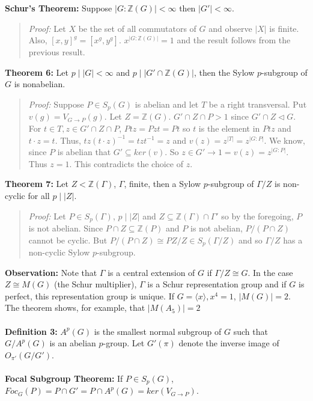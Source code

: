 {\bf Schur's Theorem:} 
Suppose $|G:{\mathbb Z}(G)| < \infty$ then $|G'|< \infty$.
\begin{quote}
\emph{Proof:}  
Let $X$ be the set of all commutators of $G$ and observe $|X|$ is finite.  Also,
$[x,y]^g= [x^g, y^g]$.  
$x^{|G:{\mathbb Z }(G)|}=1$ and the result follows from the previous result.
\end{quote}
{\bf Theorem 6:} Let $p \mid |G| < \infty$ and $p \mid |G' \cap {\mathbb Z}(G)|$, then
the Sylow $p$-subgroup of $G$ is nonabelian.
\begin{quote}
\emph{Proof:}  
Suppose $P \in S_p(G)$ is abelian and let $T$ be a right transversal.  Put
$v(g)= V_{G \rightarrow P}(g)$. Let $Z= {\mathbb Z}(G)$.  
$G' \cap Z \cap P > 1$ since $G' \cap Z \lhd G$.
For $t \in T, z \in G' \cap Z \cap P$, $Ptz=Pzt=Pt$ so $t$ is the element in $Ptz$ and
$t \cdot z= t$.  Thus, $tz(t \cdot z)^{-1}= tzt^{-1}=z$ and $v(z)= z^{|T|}=z^{|G:P|}$.
We know, since $P$ is abelian that $G' \subseteq ker(v)$. So 
$z \in G'\rightarrow 1=v(z)=z^{|G:P|}$.  Thus $z=1$.  This contradicts the choice of $z$.
\end{quote}
{\bf Theorem 7:} Let $Z < {\mathbb Z}(\Gamma)$, $\Gamma$, finite, then a Sylow $p$-subgroup of
$\Gamma/Z$ is non-cyclic for all $p \mid |Z|$.
\begin{quote}
\emph{Proof:}  
Let $P \in S_p( \Gamma )$, $p \mid |Z|$ and $Z \subseteq {\mathbb Z}( \Gamma ) \cap \Gamma'$
so by the foregoing, $P$ is not abelian.  Since $P \cap Z \subseteq {\mathbb Z}(P)$ and
$P$ is not abelian, $P/(P \cap Z)$ cannot be cyclic.  
But $P/(P \cap Z) \cong PZ/Z \in S_p(\Gamma/Z)$ and so $\Gamma/Z$ has a 
non-cyclic Sylow $p$-subgroup.
\end{quote}
{\bf Observation:} Note that $\Gamma$ is a central extension of $G$ if $\Gamma/Z \cong G$.
In the case $Z \cong M(G)$ (the Schur multiplier), $\Gamma$ is a Schur representation group and
if $G$ is perfect, this representation group is unique.  
If $G= \langle x \rangle , x^4=1$, $|M(G)|=2$.  The
theorem shows, for example, that $|M(A_5)|=2$
\\
\\
{\bf Definition 3:} $A^p(G)$ is the smallest normal subgroup of $G$ such that
$G/A^p(G)$ is an abelian $p$-group. Let $G'(\pi)$ denote the inverse image of
$O_{\pi'}(G/G')$.
\\
\\
{\bf Focal Subgroup Theorem:}  
If $P \in S_p(G)$, $Foc_G(P) = P \cap G' = P \cap A^p(G) = ker(V_{G \rightarrow P})$.
